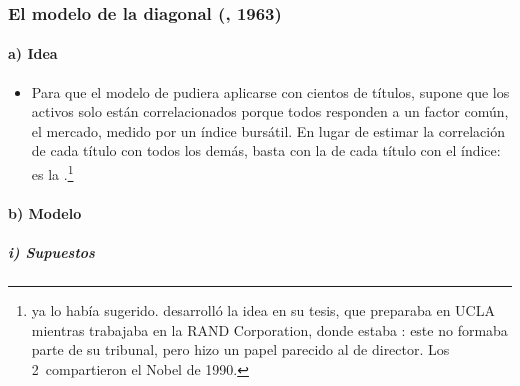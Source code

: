 \documentclass[11pt]{article}
\begin{document}
\subsubsection{El modelo de la diagonal (, 1963)}\label{sec:sharpe-diagonal}

\paragraph{a) Idea}

\begin{itemize}
\item Para que el modelo de  pudiera aplicarse con cientos de títulos, \textcite{Sharpe1963Simplified} supone que los activos solo están correlacionados porque todos responden a un factor común, el mercado, medido por un índice bursátil. En lugar de estimar la correlación de cada título con todos los demás, basta con la de cada título con el índice: es la .\footnote{ ya lo había sugerido\nocite{Markowitz1959Portfolio}.  desarrolló la idea en su tesis, que preparaba en UCLA mientras trabajaba en la RAND Corporation, donde estaba : este no formaba parte de su tribunal, pero hizo un papel parecido al de director\nocite{Sharpe1990Biografia}. Los 2~compartieron el Nobel de 1990.}
\end{itemize}

\paragraph{b) Modelo}

\subparagraph{i) Supuestos}
\end{document}

